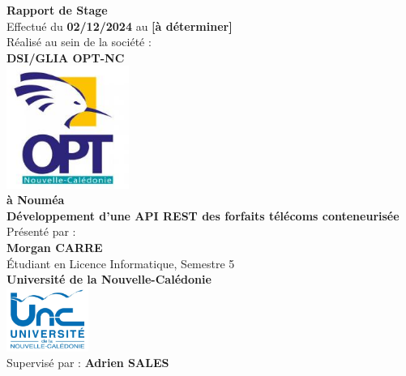 \documentclass[11pt]{article}
\begin{document}
		
		\begin{titlepage}
			\begin{center}
				{\LARGE \textbf{Rapport de Stage}} \\[1cm]
				{\large Effectué du \textbf{02/12/2024} au \textbf{[à déterminer]}} \\[1cm]
				
				
				
				{\large Réalisé au sein de la société :} \\[1cm]
				{\Large \textbf{DSI/GLIA OPT-NC}} \\[1cm]
				
				\includegraphics[width=0.3\textwidth]{asset/logo_opt.jpg} \\[1cm] 
				
				
				\textbf{à Nouméa} \\[1cm]
				
				{\large \textbf{Développement d'une API REST des forfaits télécoms conteneurisée}} \\[0.5cm]
				
				{\large Présenté par :} \\[1cm]
				{\LARGE \textbf{Morgan CARRE}} \\[0.3cm]
				Étudiant en Licence Informatique, Semestre 5 \\[0.3cm]
				\textbf{Université de la Nouvelle-Calédonie} \\[0.3cm]
				
				\includegraphics[width=0.2\textwidth]{asset/logo_universite.jpg} \\[2cm]
				
				{\large Supervisé par : \textbf{Adrien SALES}} \\[0.3cm]
			\end{center}
		\end{titlepage}
		
\end{document}
